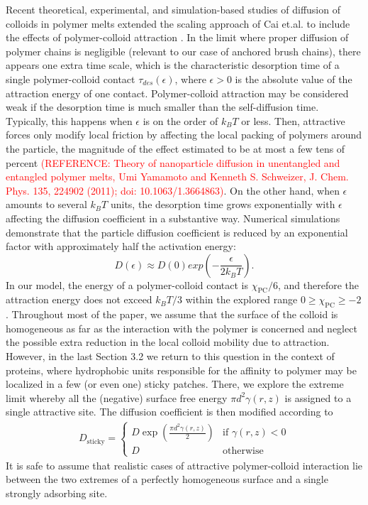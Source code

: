\documentclass[12pt, a4paper]{article}
\begin{document}
Recent theoretical, experimental, and simulation-based studies of diffusion of colloids in polymer melts extended the scaling approach of Cai et.al. to include the effects of polymer-colloid attraction \cite{Yamamoto2018, Carroll2018}. In the limit where proper diffusion of polymer chains is negligible (relevant to our case of anchored brush chains), there appears one extra time scale, which is the characteristic desorption time of a single polymer-colloid contact $\tau_{des}(\epsilon)$, where $\epsilon > 0$ is the absolute value of the attraction energy of one contact. Polymer-colloid attraction may be considered weak if the desorption time is much smaller than the self-diffusion time. Typically, this happens when $\epsilon$ is on the order of $k_B T$ or less. Then, attractive forces only modify local friction by affecting the local packing of polymers around the particle, the magnitude of the effect estimated to be at most a few tens of percent
\cite{Yamamoto2011} \textcolor{red}{(REFERENCE: Theory of nanoparticle diffusion in unentangled and entangled polymer melts,  Umi Yamamoto and Kenneth S. Schweizer, J. Chem. Phys. 135, 224902 (2011); doi: 10.1063/1.3664863)}. 
On the other hand, when $\epsilon$ amounts to several $k_B T$ units, the desorption time grows exponentially with $\epsilon$ affecting the diffusion coefficient in a substantive way. Numerical simulations \cite{Yamamoto2018} demonstrate that the particle diffusion coefficient is reduced by an exponential factor with approximately half the activation energy:
\begin{equation}
    D(\epsilon)\approx D(0) exp(-\frac{\epsilon}{2 k_B T}).
    \label{eq:Yamamoto}
\end{equation}
In our model, the energy of a polymer-colloid contact is $\chi_{\text{PC}}/6$, and therefore the attraction energy does not exceed $k_B T/3$ within the explored range $0\geq\chi_{\text{PC}}\geq-2$.
Throughout most of the paper, we assume that the surface of the colloid is homogeneous as far as the interaction with the polymer is concerned and neglect the possible extra reduction in the local colloid mobility due to attraction. However, in the last Section 3.2 we return to this question in the context of proteins, where hydrophobic units responsible for the affinity to polymer may be localized in a few (or even one) sticky patches. There, we explore the extreme limit whereby all the (negative) surface free energy $\pi d^2 \gamma(r,z)$ is assigned to a single attractive site. The diffusion coefficient is then modified according to
\begin{eqnarray}
    D_{\text{sticky}} = 
    \begin{cases}
        D \exp(\frac{\pi d^2 \gamma(r,z)}{2}) & \text{if } \gamma(r,z) < 0 \\
        D & \text{otherwise}
    \end{cases}
     \label{eq:Sticky diff}
\end{eqnarray}
It is safe to assume that realistic cases of attractive polymer-colloid interaction lie between the two extremes of a perfectly homogeneous surface and a single strongly adsorbing site.
\end{document}
